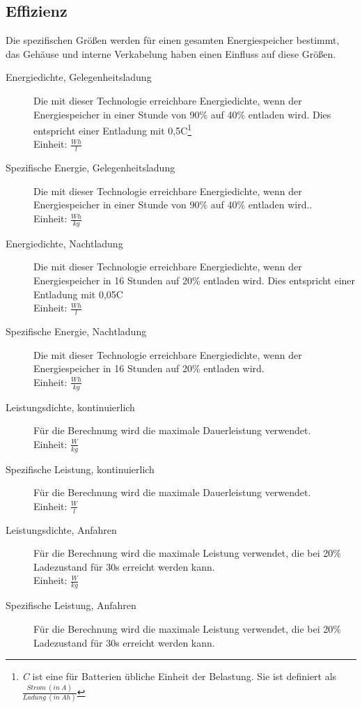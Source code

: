 \subsection{Effizienz}
Die spezifischen Größen werden für einen gesamten Energiespeicher bestimmt, das Gehäuse und interne Verkabelung haben einen Einfluss auf diese Größen.
\begin{description}
	\item[Energiedichte, Gelegenheitsladung] Die mit dieser Technologie erreichbare Energiedichte, wenn der Energiespeicher in einer Stunde von 90\% auf 40\% entladen wird. Dies entspricht einer Entladung mit 0,5C\footnote{\emph{C} ist eine für Batterien übliche Einheit der Belastung. Sie ist definiert als $\frac{Strom\ (in\ A)}{Ladung\ (in\ Ah)}$}\\
	Einheit: $\frac{Wh}{l}$ 
	\item[Spezifische Energie, Gelegenheitsladung] Die mit dieser Technologie erreichbare Energiedichte, wenn der Energiespeicher in einer Stunde von 90\% auf 40\% entladen wird..\\
	Einheit: $\frac{Wh}{kg}$
	\item[Energiedichte, Nachtladung] Die mit dieser Technologie erreichbare Energiedichte, wenn der Energiespeicher in 16 Stunden auf 20\% entladen wird. Dies entspricht einer Entladung mit 0,05C\\
	Einheit: $\frac{Wh}{l}$
	\item[Spezifische Energie, Nachtladung] Die mit dieser Technologie erreichbare Energiedichte, wenn der Energiespeicher in 16 Stunden auf 20\% entladen wird.\\
	Einheit: $\frac{Wh}{kg}$
	\item[Leistungsdichte, kontinuierlich] Für die Berechnung wird die maximale Dauerleistung verwendet.\\
	Einheit: $\frac{W}{kg}$
	\item[Spezifische Leistung, kontinuierlich] Für die Berechnung wird die maximale Dauerleistung verwendet.\\
	Einheit: $\frac{W}{l}$
	\item[Leistungsdichte, Anfahren] Für die Berechnung wird die maximale Leistung verwendet, die bei 20\% Ladezustand für 30s erreicht werden kann.\\
	Einheit: $\frac{W}{kg}$
	\item[Spezifische Leistung, Anfahren] Für die Berechnung wird die maximale Leistung verwendet, die bei 20\% Ladezustand für 30s erreicht werden kann.\\

\end{description}
